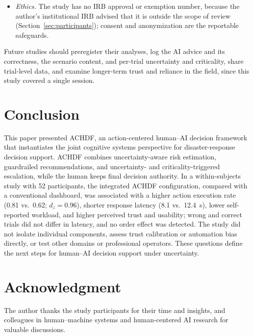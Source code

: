 \documentclass[journal]{IEEEtran}
\theoremstyle{plain}
\theoremstyle{definition}
\begin{document}
\begin{itemize}
        \item \emph{Ethics.} The study has no IRB approval or exemption number, because the author's institutional IRB advised that it is outside the scope of review (Section~\ref{sec:participants}); consent and anonymization are the reportable safeguards.
    \end{itemize}
    Future studies should preregister their analyses, log the AI advice and its correctness, the scenario content, and per-trial uncertainty and criticality, share trial-level data, and examine longer-term trust and reliance in the field, since this study covered a single session.

\section{Conclusion}
This paper presented ACHDF, an action-centered human--AI decision framework that instantiates the joint cognitive systems perspective for disaster-response decision support. ACHDF combines uncertainty-aware risk estimation, guardrailed recommendations, and uncertainty- and criticality-triggered escalation, while the human keeps final decision authority. In a within-subjects study with 52 participants, the integrated ACHDF configuration, compared with a conventional dashboard, was associated with a higher action execution rate (0.81 vs.\ 0.62; $d_z=0.96$), shorter response latency (8.1 vs.\ 12.4~s), lower self-reported workload, and higher perceived trust and usability; wrong and correct trials did not differ in latency, and no order effect was detected. The study did not isolate individual components, assess trust calibration or automation bias directly, or test other domains or professional operators. These questions define the next steps for human--AI decision support under uncertainty.

\section*{Acknowledgment}
The author thanks the study participants for their time and insights, and colleagues in human--machine systems and human-centered AI research for valuable discussions.


% 
\end{document}
